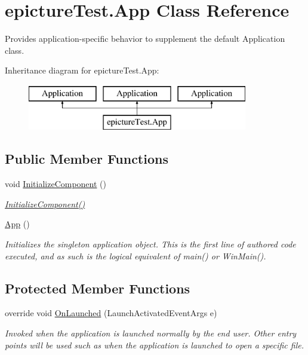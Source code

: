 \hypertarget{classepicture_test_1_1_app}{}\section{epicture\+Test.\+App Class Reference}
\label{classepicture_test_1_1_app}


Provides application-\/specific behavior to supplement the default Application class.  


Inheritance diagram for epicture\+Test.\+App\+:\begin{figure}[H]
\begin{center}
\leavevmode
\includegraphics[height=2.000000cm]{classepicture_test_1_1_app}
\end{center}
\end{figure}
\subsection*{Public Member Functions}
\begin{DoxyCompactItemize}
\item 
void \mbox{\hyperlink{classepicture_test_1_1_app_aa0efa1442714a43751ba30d2adc7c61d}{Initialize\+Component}} ()
\begin{DoxyCompactList}\small\item\em \mbox{\hyperlink{classepicture_test_1_1_app_aa0efa1442714a43751ba30d2adc7c61d}{Initialize\+Component()}} \end{DoxyCompactList}\item 
\mbox{\hyperlink{classepicture_test_1_1_app_a66466105413d6f032cc51d14e38b8248}{App}} ()
\begin{DoxyCompactList}\small\item\em Initializes the singleton application object. This is the first line of authored code executed, and as such is the logical equivalent of main() or Win\+Main(). \end{DoxyCompactList}\end{DoxyCompactItemize}
\subsection*{Protected Member Functions}
\begin{DoxyCompactItemize}
\item 
override void \mbox{\hyperlink{classepicture_test_1_1_app_a2a8b2cc6742804e2107661d14e9f6f43}{On\+Launched}} (Launch\+Activated\+Event\+Args e)
\begin{DoxyCompactList}\small\item\em Invoked when the application is launched normally by the end user. Other entry points will be used such as when the application is launched to open a specific file. \end{DoxyCompactList}\end{DoxyCompactItemize}
